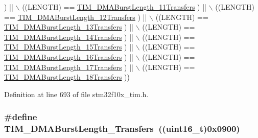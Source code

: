 \begin{DoxyCode}
      ) || \(\backslash\)
                                   ((LENGTH) == \hyperlink{group___t_i_m___d_m_a___burst___length_ga0ca63a3caeaf1e85bd54961891949de7}{TIM\_DMABurstLength\_11Transfers}
      ) || \(\backslash\)
                                   ((LENGTH) == \hyperlink{group___t_i_m___d_m_a___burst___length_ga9160d52913bbd7ad1e663ff943d01852}{TIM\_DMABurstLength\_12Transfers}
      ) || \(\backslash\)
                                   ((LENGTH) == \hyperlink{group___t_i_m___d_m_a___burst___length_ga11485e9eee8a6a7edc1df868755eab85}{TIM\_DMABurstLength\_13Transfers}
      ) || \(\backslash\)
                                   ((LENGTH) == \hyperlink{group___t_i_m___d_m_a___burst___length_gab1a097ca7404e518839df99795443fb0}{TIM\_DMABurstLength\_14Transfers}
      ) || \(\backslash\)
                                   ((LENGTH) == \hyperlink{group___t_i_m___d_m_a___burst___length_gad13373f5fd246557a4fc487dc43c37ec}{TIM\_DMABurstLength\_15Transfers}
      ) || \(\backslash\)
                                   ((LENGTH) == \hyperlink{group___t_i_m___d_m_a___burst___length_gafb644e6033f7b46c602b02754b69fde0}{TIM\_DMABurstLength\_16Transfers}
      ) || \(\backslash\)
                                   ((LENGTH) == \hyperlink{group___t_i_m___d_m_a___burst___length_ga5b2c97f650a3c1726965187d852b8cc5}{TIM\_DMABurstLength\_17Transfers}
      ) || \(\backslash\)
                                   ((LENGTH) == \hyperlink{group___t_i_m___d_m_a___burst___length_gaed9f2afef174079f6eb6927abd995b9b}{TIM\_DMABurstLength\_18Transfers}
      ))
\end{DoxyCode}


Definition at line 693 of file stm32f10x\+\_\+tim.\+h.

\subsubsection[{\texorpdfstring{T\+I\+M\+\_\+\+D\+M\+A\+Burst\+Length\+\_\+10\+Transfers}{TIM_DMABurstLength_10Transfers}}]{\setlength{\rightskip}{0pt plus 5cm}\#define T\+I\+M\+\_\+\+D\+M\+A\+Burst\+Length\+\_\+Transfers~(({\bf uint16\+\_\+t})0x0900)}\hypertarget{group___t_i_m___d_m_a___burst___length_ga2fc09f2148cf6ebddc8e67116212259c}{}\label{group___t_i_m___d_m_a___burst___length_ga2fc09f2148cf6ebddc8e67116212259c}


